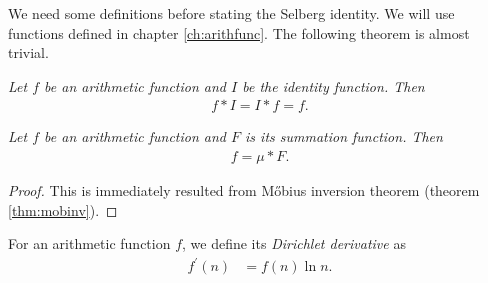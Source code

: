 \documentclass{subfile}
\begin{document}
	We need some definitions before stating the Selberg identity. We will use functions defined in chapter \eqref{ch:arithfunc}. The following theorem is almost trivial.
	\begin{theorem}\slshape
		Let $f$ be an arithmetic function and $I$ be the identity function. Then
			\begin{align*}
				f\ast I=I\ast f=f.
			\end{align*}
	\end{theorem}

	\begin{theorem}\slshape
		\label{thm:dirichmobi}
		Let $f$ be an arithmetic function and $F$ is its summation function. Then
			\begin{align*}
				f=\mu\ast F.
			\end{align*}
	\end{theorem}
	
	\begin{proof}
		This is immediately resulted from M\H obius inversion theorem (theorem \eqref{thm:mobinv}).
	\end{proof}
	
	\begin{definition}
		For an arithmetic function $f$, we define its \textit{Dirichlet derivative} as
			\begin{align*}
				f^\prime(n) & =f(n)\ln n.
			\end{align*}
	\end{definition}
	
\end{document}
